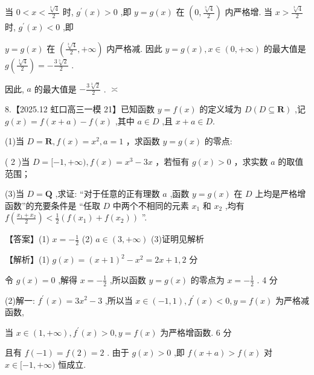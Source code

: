 \documentclass[10pt]{article}
\begin{document}
当 \(0 < x < \frac{\sqrt[3]{4}}{2}\) 时, \({g}^{\prime }\left( x\right)  > 0\) ,即 \(y = g\left( x\right)\) 在 \(\left( {0,\frac{\sqrt[3]{4}}{2}}\right)\) 内严格增. 当 \(x > \frac{\sqrt[3]{4}}{2}\) 时, \({g}^{\prime }\left( x\right)  < 0\) ,即

\(y = g\left( x\right)\) 在 \(\left( {\frac{\sqrt[3]{4}}{2}, + \infty }\right)\) 内严格减. 因此 \(y = g\left( x\right) ,x \in  \left( {0, + \infty }\right)\) 的最大值是 \(g\left( \frac{\sqrt[3]{4}}{2}\right)  =  - \frac{3\sqrt[3]{2}}{2}\) .

因此, \(a\) 的最大值是 \(- \frac{3\sqrt[3]{2}}{2}\) . \(\asymp\)

8.【2025.12 虹口高三一模 21】已知函数 \(y = f\left( x\right)\) 的定义域为 \(D\left( {D \subseteq  \mathbf{R}}\right)\) ,记 \(g\left( x\right)  = f\left( {x + a}\right)  - f\left( x\right)\) ,其中 \(a \in  D\) ,且 \(x + a \in  D.\)

(1)当 \(D = \mathbf{R},f\left( x\right)  = {x}^{2},a = 1\) ，求函数 \(y = g\left( x\right)\) 的零点:

( 2 )当 \(D = \lbrack  - 1, + \infty ),f\left( x\right)  = {x}^{3} - {3x}\) ，若恒有 \(g\left( x\right)  > 0\) ，求实数 \(a\) 的取值范围；

(3)当 \(D = \mathbf{Q}\) ,求证: “对于任意的正有理数 \(a\) ,函数 \(y = g\left( x\right)\) 在 \(D\) 上均是严格增函数”的充要条件是 “任取 \(D\) 中两个不相同的元素 \({x}_{1}\) 和 \({x}_{2}\) ,均有 \(f\left( \frac{{x}_{1} + {x}_{2}}{2}\right)  < \frac{1}{2}\left( {f\left( {x}_{1}\right)  + f\left( {x}_{2}\right) }\right)\) ”.

【答案】(1) \(x =  - \frac{1}{2}\) (2) \(a \in  \left( {3, + \infty }\right)\) (3)证明见解析

【解析】(1) \(g\left( x\right)  = {\left( x + 1\right) }^{2} - {x}^{2} = {2x} + 1,2\) 分

令 \(g\left( x\right)  = 0\) ,解得 \(x =  - \frac{1}{2}\) ,所以函数 \(y = g\left( x\right)\) 的零点为 \(x =  - \frac{1}{2}\) . 4 分

(2)解一: \({f}^{\prime }\left( x\right)  = 3{x}^{2} - 3\) ,所以当 \(x \in  \left( {-1,1}\right) ,{f}^{\prime }\left( x\right)  < 0,y = f\left( x\right)\) 为严格减函数,

当 \(x \in  \left( {1, + \infty }\right) ,{f}^{\prime }\left( x\right)  > 0,y = f\left( x\right)\) 为严格增函数. 6 分

且有 \(f\left( {-1}\right)  = f\left( 2\right)  = 2\) . 由于 \(g\left( x\right)  > 0\) ,即 \(f\left( {x + a}\right)  > f\left( x\right)\) 对 \(x \in  \lbrack  - 1, + \infty )\) 恒成立.
\end{document}
